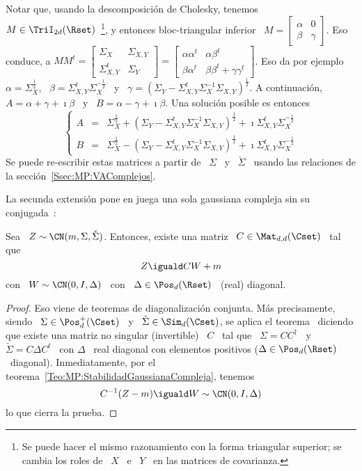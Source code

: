 %
Notar  que,   usando  la  descomposici\'on   de  Cholesky,  tenemos  \   $M  \in
\TriI_{2d}(\Rset)$~\footnote{Se puede  hacer el mismo razonamiento  con la forma
  triangular superior; se cambia los roles de \  $X$ \ e \ $Y$ \ en las matrices
  de covarianza.},  y entonces bloc-triangular  inferior \ $M  = \begin{bmatrix}
  \alpha  &  0  \\  \beta  &  \gamma \end{bmatrix}$.   Eso  conduce,  a  $M  M^t
= \begin{bmatrix} \Sigma_X & \Sigma_{X,Y} \\ \Sigma_{X,Y}^t &
  \Sigma_Y \end{bmatrix}  = \begin{bmatrix} \alpha \alpha^t &  \alpha \beta^t \\
  \beta \alpha^t &  \beta \beta^t + \gamma \gamma^t  \end{bmatrix}$.  Eso da por
ejemplo   \   $\alpha  =   \Sigma_X^{\frac12}$,   \   $\beta  =   \Sigma_{X,Y}^t
\Sigma_X^{-\frac12}$  \   y  \  $\gamma  =  \left(   \Sigma_Y  -  \Sigma_{X,Y}^t
  \Sigma_X^{-1} \Sigma_{X,Y} \right)^{\frac12}$.   A continuaci\'on, $A = \alpha
+  \gamma +  \imath \beta$  \ y  \ $B  = \alpha  - \gamma  + \imath  \beta$. Una
soluci\'on posible es entonces
%
\[
\left\{\begin{array}{lll}
A & = & \Sigma_X^{\frac12} + \left( \Sigma_Y - \Sigma_{X,Y}^t \Sigma_X^{-1} \Sigma_{X,Y}
\right)^{\frac12}  + \imath \Sigma_{X,Y}^t
\Sigma_X^{-\frac12}\\[2.5mm]
%
B & = &  \Sigma_X^{\frac12} - \left( \Sigma_Y - \Sigma_{X,Y}^t \Sigma_X^{-1} \Sigma_{X,Y}
\right)^{\frac12} + \imath \Sigma_{X,Y}^t
\Sigma_X^{-\frac12}
\end{array}\right.
\]
%
Se  puede   re-escribir  estas  matrices   a  partir  de   \  $\Sigma$  \   y  \
$\check{\Sigma}$       \      usando       las       relaciones      de       la
secci\'on~\ref{Ssec:MP:VAComplejos}.

La  secunda  extensi\'on  pone  en  juega  una sola  gaussiana  compleja  sin  su
conjugada~\cite{EriKoi06, SchSch03}:
%
\begin{teorema}
\label{Teo:MP:GaussianaComplejaWIDiago}
%
  Sea \ $Z \sim \CN(m,\Sigma,\check{\Sigma})$. Entonces, existe una matriz \ $C
  \in \Mat_{d,d}(\Cset)$ \ tal que
  \[
  Z \iguald C W + m
  \]
  con \ $W \sim \CN(0,I,\Delta)$ \ con \ $\Delta \in \Pos_d(\Rset)$ \ (real) diagonal.
\end{teorema}
\begin{proof}
  Eso  viene  de teoremas  de  diagonalizaci\'on  conjunta. M\'as  precisamente,
  siendo \ $\Sigma  \in \Pos_d^+(\Cset)$ \ y \  $\check{\Sigma} \in \Sim_d(\Cset)$, se
  aplica el  teorema~\cite[Teo.~7.6.5]{HorJoh13} diciendo que  existe una matriz
  no  singular (invertible)  \  $C$ \  tal  que \  $\Sigma  = C  C^\dag$  \ y  \
  $\check{\Sigma} = C  \Delta C^t$ \ con $\Delta$ \  real diagonal con elementos
  positivos  ($\Delta  \in  \Pos_d(\Rset)$  \  diagonal).  Inmediatamente,  por  el
  teorema~\ref{Teo:MP:StabilidadGaussianaCompleja}, tenemos
  \[
  C^{-1} (Z - m) \iguald W \sim \CN(0,I,\Delta)
  \]
  lo que cierra la prueba.
\end{proof}



